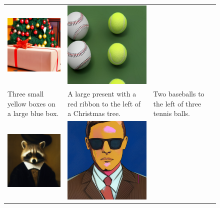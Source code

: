 \begin{figure}
\begin{tabular}{p{50mm}p{50mm}p{50mm}}
    \includegraphics[width=50mm]{figs/verticals/composition_00681_maskgit_sresg1r1} &
    \includegraphics[width=50mm]{figs/verticals/composition_01426_maskgit_sresg1r1}
    \\
    \small Three small yellow boxes on a large blue box. &
    \small A large present with a red ribbon to the left of a Christmas tree. &
    \small Two baseballs to the left of three tennis balls.
    \\
    \includegraphics[width=50mm]{figs/verticals/style_00020_maskgit_sresg1r1} &
    \includegraphics[width=50mm]{figs/verticals/style_00022_maskgit_sresg1r1} &

\end{tabular}
\end{figure}
